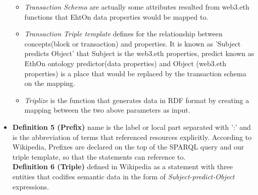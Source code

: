 \begin{itemize}
	\begin{itemize}
		\item \textit{Transaction Schema} are actually some attributes resulted from web3.eth functions that EhtOn data properties would be mapped to.
		\item \textit{Transaction Triple template} defines for the relationship between concepts(block or transaction) and properties. It is known as 'Subject predicts Object' that Subject is the web3.eth properties, predict known as EthOn ontology predictor(data properties) and Object (web3.eth properties) is a place that would be replaced by the transaction schema on the mapping. 
		\item \textit{Triplize} is the function that generates data in RDF format by creating a mapping between the two above parameters as input. 
	\end{itemize} 
     \item \textbf{Definition 5 (Prefix)} name is the label or local part separated with ':' and is the abbreviation of terms that referenced resources explicitly. According to Wikipedia, Prefixes are declared on the top of the SPARQL query and our triple template, so that the statements can reference to.\\
     \textbf{Definition 6 (Triple)} defined in Wikipedia as a statement with three entities that codifies semantic data in the form of \textit{Subject-predict-Object} expressions.\\
\end{itemize}
